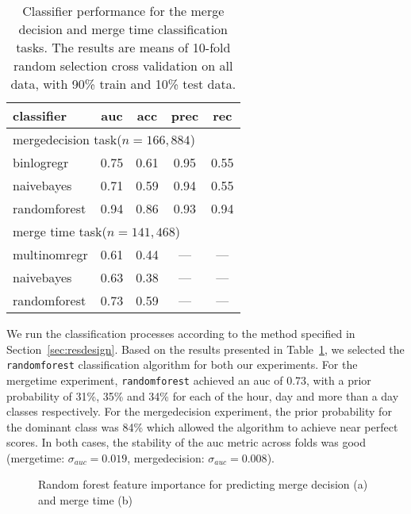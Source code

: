 \documentclass{sig-alternate}
\begin{document}
\begin{table}
  \centering
  \begin{tabular}{lcccc}
    \hline
    {\bf classifier} & {\sc auc} & {\sc acc} & {\sc prec} & {\sc rec} \\
    \hline
    \multicolumn{4}{l}{\textsf{mergedecision} task($n = 166,884$)} \\
    binlogregr    & 0.75 & 0.61 & 0.95  & 0.55 \\
    naivebayes    & 0.71 & 0.59 & 0.94 &  0.55 \\
    randomforest  & 0.94 & 0.86 & 0.93 & 0.94 \\
    \hline
    \multicolumn{4}{l}{\textsf{merge time} task($n = 141,468$)} \\
    multinomregr  & 0.61 & 0.44 & --- & --- \\
    naivebayes    & 0.63 & 0.38 & --- & ---  \\
    randomforest  & 0.73 & 0.59 & --- & ---   \\
    \hline
  \end{tabular}
  \caption{Classifier performance for the merge decision and merge time
  classification tasks. The results are means of 10-fold random selection
  cross validation on all data, with 90\% train and 10\% test data.}
  \label{tab:classif-perf}
\end{table}

We run the classification processes according to the method specified in
Section~\ref{sec:resdesign}.  Based on the results presented in
Table~\ref{tab:classif-perf}, we selected the \texttt{randomforest}
classification algorithm for both our experiments. For the \textsf{mergetime}
experiment, \texttt{randomforest} achieved an {\sc auc} of 0.73, with a prior
probability of 31\%, 35\% and 34\% for each of the \textsf{hour}, \textsf{day}
and \textsf{more than a day} classes respectively. For the \textsf{mergedecision}
experiment, the prior probability for the dominant class was 84\% which allowed
the algorithm to achieve near perfect scores. In both cases, the stability of
the {\sc auc} metric across folds was good (\textsf{mergetime}: $\sigma_{auc} =
0.019$, \textsf{mergedecision}: $\sigma_{auc} = 0.008$).

\begin{figure*}
\centering
{}
\caption{Random forest feature importance for predicting merge decision (a) and merge time (b)}
\label{fig:varimp}
\end{figure*}
\end{document}
